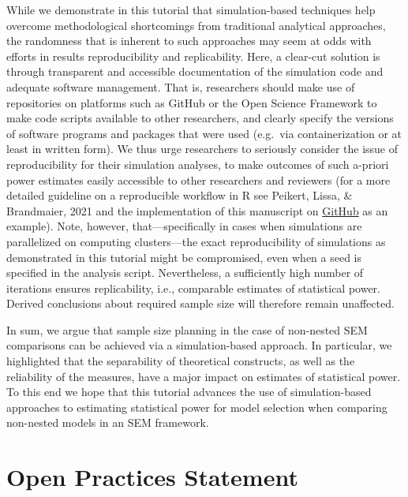 \documentclass[
  man,floatsintext]{apa6}
\begin{document}
While we demonstrate in this tutorial that simulation-based techniques help overcome methodological shortcomings from traditional analytical approaches, the randomness that is inherent to such approaches may seem at odds with efforts in results reproducibility and replicability. Here, a clear-cut solution is through transparent and accessible documentation of the simulation code and adequate software management. That is, researchers should make use of repositories on platforms such as GitHub or the Open Science Framework to make code scripts available to other researchers, and clearly specify the versions of software programs and packages that were used (e.g.~via containerization or at least in written form). We thus urge researchers to seriously consider the issue of reproducibility for their simulation analyses, to make outcomes of such a-priori power estimates easily accessible to other researchers and reviewers (for a more detailed guideline on a reproducible workflow in R see Peikert, Lissa, \& Brandmaier, 2021 and the implementation of this manuscript on \href{https://github.com/ebuchberger/Estimating-Power-for-SEM}{GitHub} as an example). Note, however, that---specifically in cases when simulations are parallelized on computing clusters---the exact reproducibility of simulations as demonstrated in this tutorial might be compromised, even when a seed is specified in the analysis script. Nevertheless, a sufficiently high number of iterations ensures replicability, i.e., comparable estimates of statistical power. Derived conclusions about required sample size will therefore remain unaffected.

In sum, we argue that sample size planning in the case of non-nested SEM comparisons can be achieved via a simulation-based approach. In particular, we highlighted that the separability of theoretical constructs, as well as the reliability of the measures, have a major impact on estimates of statistical power. To this end we hope that this tutorial advances the use of simulation-based approaches to estimating statistical power for model selection when comparing non-nested models in an SEM framework.

\newpage

\hypertarget{open-practices-statement}{%
\section*{Open Practices Statement}\label{open-practices-statement}}
\end{document}
